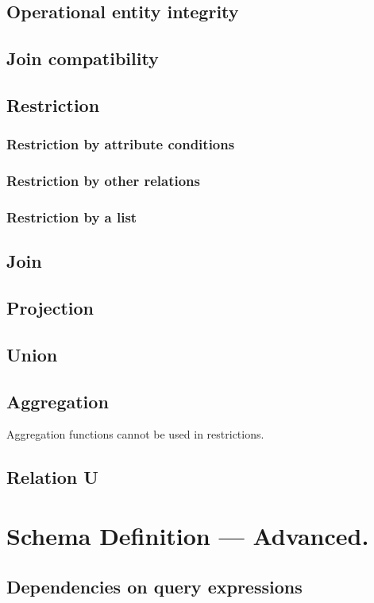 \documentclass[letter,10pt]{article}
\begin{document}
\subsection{Operational entity integrity}
\subsection{Join compatibility}
\subsection{Restriction}
\subsubsection{Restriction by attribute conditions}
\subsubsection{Restriction by other relations}
\subsubsection{Restriction by a list}

\subsection{Join}
\subsection{Projection}
\subsection{Union}
\subsection{Aggregation}
Aggregation functions cannot be used in restrictions. 
\subsection{Relation U}

\section{Schema Definition --- Advanced.}
\subsection{Dependencies on query expressions}
\end{document}
